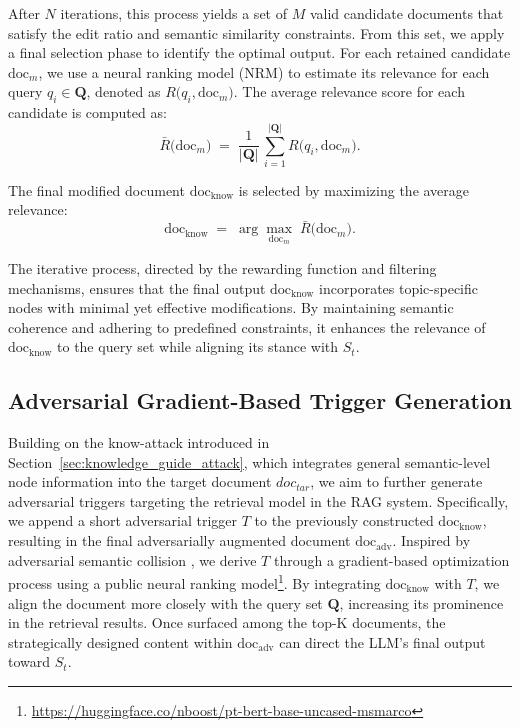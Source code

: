 After $N$ iterations, this process yields a set of $M$ valid candidate documents that satisfy the edit ratio and semantic similarity constraints. From this set, we apply a final selection phase to identify the optimal output. For each retained candidate $\text{doc}_m$, we use a neural ranking model (NRM) to estimate its relevance for each query $q_i \in \mathbf{Q}$, denoted as $R\bigl(q_i, \text{doc}_m\bigr)$. The average relevance score for each candidate is computed as:
\[
\bar{R}\bigl(\text{doc}_m\bigr) \;=\; 
\frac{1}{|\mathbf{Q}|}\,\sum_{i=1}^{|\mathbf{Q}|} R\bigl(q_i, \text{doc}_m\bigr).
\]

The final modified document $\text{doc}_{\text{know}}$ is selected by maximizing the average relevance:
\[
\text{doc}_{\text{know}} 
\;=\;
\arg\max_{\text{doc}_m} \; \bar{R}\bigl(\text{doc}_m\bigr).
\]

The iterative process, directed by the rewarding function and filtering mechanisms, ensures that the final output $\text{doc}_{\text{know}}$ incorporates topic-specific nodes with minimal yet effective modifications. By maintaining semantic coherence and adhering to predefined constraints, it enhances the relevance of $\text{doc}_{\text{know}}$ to the query set while aligning its stance with $S_t$.

\subsection{Adversarial Gradient-Based Trigger Generation}
\label{sec:adv_trigger_generation}

Building on the know-attack introduced in Section~\ref{sec:knowledge_guide_attack}, which integrates general semantic-level node information into the target document \(doc_{tar}\), we aim to further generate adversarial triggers targeting the retrieval model in the RAG system. Specifically, we append a short adversarial trigger \(T\) to the previously constructed \(\text{doc}_{\text{know}}\), resulting in the final adversarially augmented document \(\text{doc}_{\text{adv}}\). Inspired by adversarial semantic collision \cite{song2020adversarial}, we derive \(T\) through a gradient-based optimization process using a public neural ranking model\footnote{\url{https://huggingface.co/nboost/pt-bert-base-uncased-msmarco}}. By integrating \(\text{doc}_{\text{know}}\) with \(T\), we align the document more closely with the query set \(\mathbf{Q}\), increasing its prominence in the retrieval results. Once surfaced among the top-K documents, the strategically designed content within \(\text{doc}_{\text{adv}}\) can direct the LLM’s final output toward \(S_t\).


